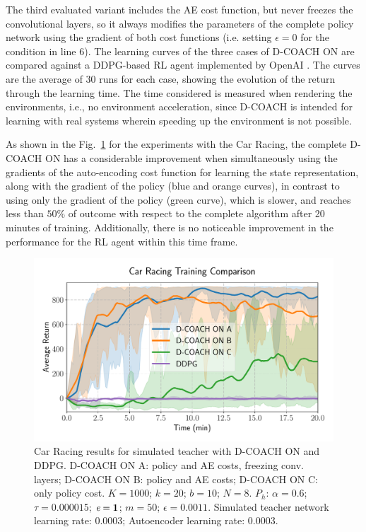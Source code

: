 The third evaluated variant includes the AE cost function, but never freezes the convolutional layers, so it always modifies the parameters of the complete policy network using the gradient of both cost functions (i.e. setting $\epsilon=0$ for the condition in line 6). The learning curves of the three cases of D-COACH ON are compared against a DDPG-based RL agent \cite{Lillicrap2015} implemented by OpenAI \cite{baselines}. The curves are the average of 30 runs for each case, showing the evolution of the return through the learning time. The time considered is measured when rendering the environments, i.e., no environment acceleration, since D-COACH is intended for learning with real systems wherein speeding up the environment is not possible.

As shown in the Fig.~\ref{fig:simulatedteachers} for the experiments with the Car Racing, the complete D-COACH ON has a considerable improvement when simultaneously using the gradients of the auto-encoding cost function for learning the state representation, along with the gradient of the policy  (blue and orange curves), in contrast to using only the gradient of the policy (green curve), which is slower, and reaches less than $50\%$ of outcome with respect to the complete algorithm after 20 minutes of training. Additionally, there is no noticeable improvement in the performance for the RL agent within this time frame.

\begin{figure}[h]
    \centering
    \includegraphics[width=0.8\linewidth]{imagenes/cap3/car_racing_sim_ICRA.pdf}
    \caption{Car Racing results for simulated teacher with D-COACH ON and DDPG. D-COACH ON A: policy and AE costs, freezing conv. layers; D-COACH ON B: policy and AE costs; D-COACH ON C: only policy cost. $K = 1000$; $k=20$; $b = 10$; $N = 8$. $P_{h}$: $\alpha = 0.6$; $\tau = 0.000015$; $\emph{e}=\textbf{1}$; $m=50$; $\epsilon=0.0011$. Simulated teacher network learning rate: $0.0003$; Autoencoder learning rate: $0.0003$.}
    \label{fig:simulatedteachers}
\end{figure}

